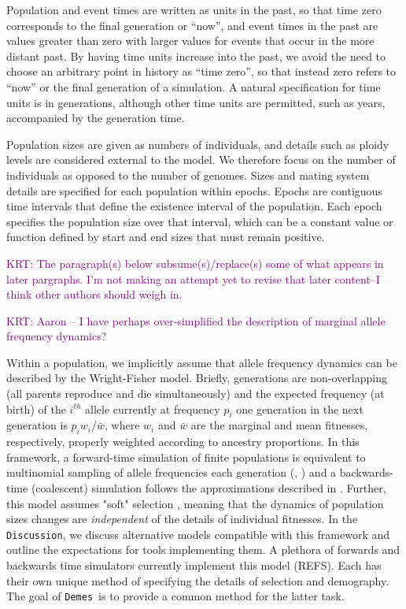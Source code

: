 \documentclass[11pt]{article}
\newcommand{\Demes}[0]{\texttt{Demes}}
\newcommand{\krtcomment}[1]{{\textcolor{purple}{KRT: #1}}}
\begin{document}
Population and event times are written as units in the past, so that time zero
corresponds to the final generation or ``now'', and event times in the past are
values greater than zero with larger values for events that occur in the more
distant past. By having time units increase into the past, we avoid the need to
choose an arbitrary point in history as ``time zero'', so that instead zero
refers to ``now'' or the final generation of a simulation. A natural
specification for time units is in generations, although other time units are
permitted, such as years, accompanied by the generation time.

Population sizes are given as numbers of individuals, and details
such as ploidy levels are considered external to the model.
We therefore focus on the number of individuals as opposed to the number of genomes.
Sizes and mating system details are specified for each population within
epochs.
Epochs are contiguous time intervals that define
the existence interval of the population. Each epoch specifies the population size
over that interval, which can be a constant value or function defined by start
and end sizes that must remain positive.

\krtcomment{The paragraph(s) below subsume(s)/replace(s) some of what appears in later pargraphs.
	I'm not making an attempt yet to revise that later content--I think other authors should
	weigh in.}

\krtcomment{Aaron -- I have perhaps over-simplified the description of marginal allele frequency dynamics?}

Within a population, we implicitly assume that allele frequency dynamics can
be described by the Wright-Fisher model.  Briefly, generations are non-overlapping (all parents
reproduce and die simultaneously) and the expected frequency (at birth) of the $i^{th}$ allele currently at frequency $p_i$
one generation in the next generation is $p_iw_i/\bar{w}$, where $w_i$ and $\bar{w}$ are the marginal and
mean fitnesses, respectively, properly weighted according to ancestry proportions. In this framework,
a forward-time simulation of finite populations is equivalent to multinomial sampling of allele frequencies each
generation (\citet[][pp 29-31]{burger2000-ul}, \citet[][pp 179-181]{crowkimura1970})
and a backwards-time (coalescent) simulation follows the approximations described in \cite[][chapter 3]{wakeley2008-hd}.
Further, this model assumes "soft" selection \citep{christiansen1975hard}, meaning that the dynamics of population sizes
changes are \textit{independent} of the details of individual fitnesses.
In the \texttt{Discussion}, we discuss alternative models compatible with this framework and outline the expectations for tools implementing
them.
A plethora of forwards and backwards time simulators currently implement this model (REFS).
Each has their own unique method of specifying the details of selection and demography.
The goal of \Demes\ is to provide a common method for the latter task.  
\end{document}

